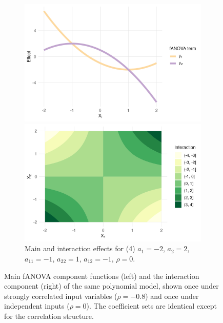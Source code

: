 \begin{figure}[htpb]
    \begin{subfigure}[t]{\textwidth}
        \centering
        \begin{minipage}[t]{0.49\textwidth}
            \includegraphics[width=\textwidth]{images/experiment_section/full_a1m20_a2m20_a11p10_a22m10_a12p10_rhop00_main.png}
        \end{minipage}%
        \hfill
        \begin{minipage}[t]{0.49\textwidth}
            \includegraphics[width=\textwidth]{images/experiment_section/full_a1m20_a2m20_a11p10_a22m10_a12p10_rhop00_interaction.png}
        \end{minipage}
        \caption{Main and interaction effects for (4) $a_1 = -2$, $a_2 = 2$, 
                 $a_{11} = -1$, $a_{22} = 1$, $a_{12} = -1$, $\rho = 0$.}
    \end{subfigure}
    \caption{Main fANOVA component functions (left) and the interaction component 
(right) of the same polynomial model, shown once under strongly correlated input variables 
($\rho = -0.8$) and once under independent inputs ($\rho = 0$). 
The coefficient sets are identical except for the correlation structure.}
    \label{fig:all_pair_02}
\end{figure}


